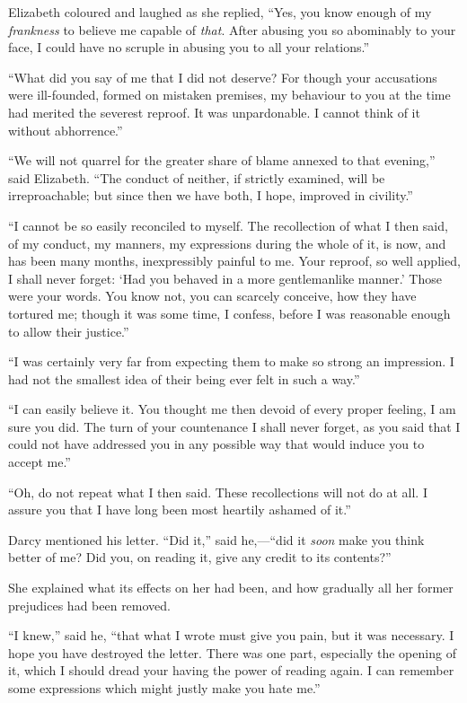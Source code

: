 \documentclass[12pt,openright]{book}
\begin{document}
Elizabeth coloured and laughed as she replied, “Yes, you know enough of my \textit{frankness} to believe me capable of \textit{that}. After abusing you so abominably to your face, I could have no scruple in abusing you to all your relations.”

“What did you say of me that I did not deserve? For though your accusations were ill-founded, formed on mistaken premises, my behaviour to you at the time had merited the severest reproof. It was unpardonable. I cannot think of it without abhorrence.”

“We will not quarrel for the greater share of blame annexed to that evening,” said Elizabeth. “The conduct of neither, if strictly examined, will be irreproachable; but since then we have both, I hope, improved in civility.”

“I cannot be so easily reconciled to myself. The recollection of what I then said, of my conduct, my manners, my expressions during the whole of it, is now, and has been many months, inexpressibly painful to me. Your reproof, so well applied, I shall never forget: ‘Had you behaved in a more gentlemanlike manner.’ Those were your words. You know not, you can scarcely conceive, how they have tortured me; though it was some time, I confess, before I was reasonable enough to allow their justice.”

“I was certainly very far from expecting them to make so strong an impression. I had not the smallest idea of their being ever felt in such a way.”

“I can easily believe it. You thought me then devoid of every proper feeling, I am sure you did. The turn of your countenance I shall never forget, as you said that I could not have addressed you in any possible way that would induce you to accept me.”

“Oh, do not repeat what I then said. These recollections will not do at all. I assure you that I have long been most heartily ashamed of it.”

Darcy mentioned his letter. “Did it,” said he,—“did it \textit{soon} make you think better of me? Did you, on reading it, give any credit to its contents?”

She explained what its effects on her had been, and how gradually all her former prejudices had been removed.

“I knew,” said he, “that what I wrote must give you pain, but it was necessary. I hope you have destroyed the letter. There was one part, especially the opening of it, which I should dread your having the power of reading again. I can remember some expressions which might justly make you hate me.”
\end{document}
